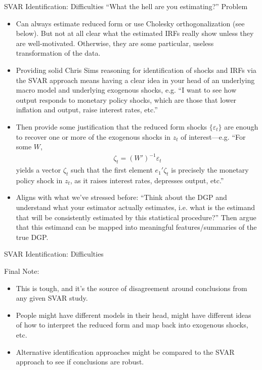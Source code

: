 \documentclass[aspectratio=169, handout]{beamer}
\begin{document}
{\scriptsize
\begin{frame}{SVAR Identification: Difficulties}
``What the hell are you estimating?'' Problem
\begin{itemize}
  \item Can \alert{always} estimate reduced form or use
    Cholesky orthogonalization (see below).
    But not at all clear what the estimated IRFs really show unless they
    are well-motivated.
    Otherwise, they are some particular, useless transformation
    of the data.

  \item
    Providing solid Chris Sims reasoning for
    identification of shocks and IRFs via the SVAR approach
    means having a clear idea in your head of an
    \alert{underlying macro model} and
    \alert{underlying exogenous shocks}, e.g.
    ``I want to see how output responds to monetary policy shocks, which
    are those that lower inflation and output, raise interest rates,
    etc.''

  \item
    Then provide some \alert{justification} that the reduced form shocks
    $\{\varepsilon_t\}$ are enough to recover one or more of the
    exogenous shocks in $z_t$ of interest---e.g. ``For some $W$,
    \begin{align*}
      \zeta_t = (W')^{-1}\varepsilon_t
    \end{align*}
    yields a vector $\zeta_t$ such that the first element $e_1'\zeta_t$
    is precisely the monetary policy shock in $z_t$, as it raises
    interest rates, depresses output, etc.''

  \item
    Aligns with what we've stressed before: ``Think about the
    \alert{DGP} and understand what your estimator actually estimates,
    i.e. what is the \alert{estimand} that will be consistently
    estimated by this statistical procedure?'' Then argue that this
    estimand can be mapped into meaningful features/summaries of the
    true DGP.

\end{itemize}
\end{frame}
}

{\footnotesize
\begin{frame}{SVAR Identification: Difficulties}

Final Note:
\begin{itemize}
  \item This is \alert{tough}, and it's the source of disagreement
    around conclusions from any given SVAR study.

  \item People might have different models in their head, might have
    different ideas of how to interpret the reduced form and map back
    into exogenous shocks, etc.

  \item Alternative identification approaches might be compared to the
    SVAR approach to see if conclusions are robust.
\end{itemize}
\end{frame}
}
\end{document}
